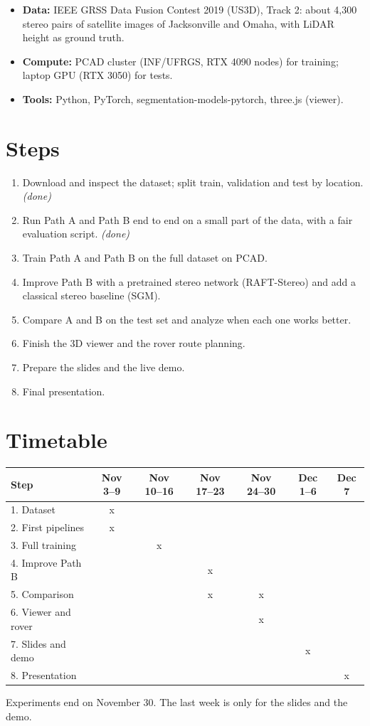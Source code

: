 \documentclass[11pt,a4paper]{article}
\begin{document}
\begin{itemize}
  \item \textbf{Data:} IEEE GRSS Data Fusion Contest 2019 (US3D), Track 2: about 4{,}300 stereo pairs of satellite images of Jacksonville and Omaha, with LiDAR height as ground truth.
  \item \textbf{Compute:} PCAD cluster (INF/UFRGS, RTX 4090 nodes) for training; laptop GPU (RTX 3050) for tests.
  \item \textbf{Tools:} Python, PyTorch, segmentation-models-pytorch, three.js (viewer).
\end{itemize}

\section*{Steps}

\begin{enumerate}
  \item Download and inspect the dataset; split train, validation and test by location. \emph{(done)}
  \item Run Path A and Path B end to end on a small part of the data, with a fair evaluation script. \emph{(done)}
  \item Train Path A and Path B on the full dataset on PCAD.
  \item Improve Path B with a pretrained stereo network (RAFT-Stereo) and add a classical stereo baseline (SGM).
  \item Compare A and B on the test set and analyze when each one works better.
  \item Finish the 3D viewer and the rover route planning.
  \item Prepare the slides and the live demo.
  \item Final presentation.
\end{enumerate}

\section*{Timetable}

\begin{center}
\renewcommand{\arraystretch}{1.3}
\begin{tabular}{|l|c|c|c|c|c|c|}
\hline
Step & Nov 3--9 & Nov 10--16 & Nov 17--23 & Nov 24--30 & Dec 1--6 & Dec 7 \\
\hline
1. Dataset          & x &   &   &   &   &   \\ \hline
2. First pipelines  & x &   &   &   &   &   \\ \hline
3. Full training    &   & x &   &   &   &   \\ \hline
4. Improve Path B   &   &   & x &   &   &   \\ \hline
5. Comparison       &   &   & x & x &   &   \\ \hline
6. Viewer and rover &   &   &   & x &   &   \\ \hline
7. Slides and demo  &   &   &   &   & x &   \\ \hline
8. Presentation     &   &   &   &   &   & x \\ \hline
\end{tabular}
\end{center}

\noindent Experiments end on November 30. The last week is only for the slides and the demo.
\end{document}
